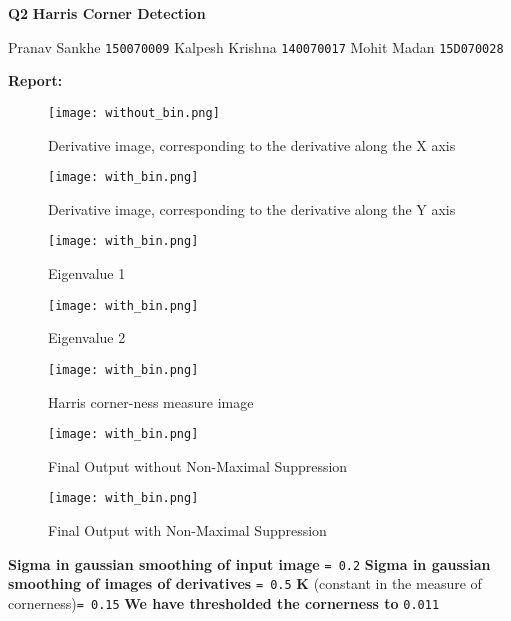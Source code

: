 \documentclass{article}
\begin{document}
\textbf{Q2}  
\textbf{Harris Corner Detection}
\vskip 0.2in

Pranav Sankhe \texttt{150070009} \newline
Kalpesh Krishna \texttt{140070017}  \newline
Mohit Madan \texttt{15D070028} \newline

\vskip 0.5in

\textbf{Report:}  
\vskip 0.1in



\begin{figure}[h!]
  \texttt{[image: without\_bin.png]}
  \caption{Derivative image, corresponding to the derivative along the X axis}  
  \label{fig:result1}
\end{figure}


\begin{figure}[h!]
  \texttt{[image: with\_bin.png]}
  \caption{Derivative image, corresponding to the derivative along the Y axis}
  \label{fig:result2}
\end{figure}

\begin{figure}[h!]
  \texttt{[image: with\_bin.png]}
  \caption{Eigenvalue 1}
  \label{fig:result2}
\end{figure}

\begin{figure}[h!]
  \texttt{[image: with\_bin.png]}
  \caption{Eigenvalue 2}
  \label{fig:result2}
\end{figure}


\begin{figure}[h!]
  \texttt{[image: with\_bin.png]}
  \caption{Harris corner-ness measure image}
  \label{fig:result2}
\end{figure}

\begin{figure}[h!]
  \texttt{[image: with\_bin.png]}
  \caption{Final Output without Non-Maximal Suppression}
  \label{fig:result2}
\end{figure}


\begin{figure}[h!]
  \texttt{[image: with\_bin.png]}
  \caption{Final Output with Non-Maximal Suppression}
  \label{fig:result2}
\end{figure}


\newpage

\textbf{Sigma in gaussian smoothing of input image } \texttt{= 0.2} \newline
\textbf{Sigma in gaussian smoothing of images of derivatives } \texttt{= 0.5} \newline
\textbf{K }(constant  in the measure of cornerness)\texttt{= 0.15} \newline
\textbf{We have thresholded the cornerness to} \texttt{0.011}
\end{document}
